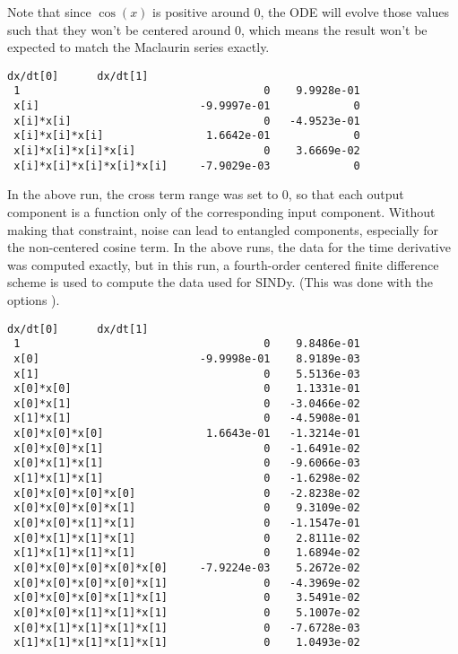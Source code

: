 \documentclass{article}
\def\lstinline#1{}%
\begin{document}
Note that since $\cos(x)$ is positive around 0, the ODE will evolve those values
such that they won't be centered around 0, which means the result won't be
expected to match the Maclaurin series exactly.
\begin{lstlisting}[language={}]
                                dx/dt[0]      dx/dt[1]
 1                                      0    9.9928e-01
 x[i]                         -9.9997e-01             0
 x[i]*x[i]                              0   -4.9523e-01
 x[i]*x[i]*x[i]                1.6642e-01             0
 x[i]*x[i]*x[i]*x[i]                    0    3.6669e-02
 x[i]*x[i]*x[i]*x[i]*x[i]     -7.9029e-03             0
\end{lstlisting}

In the above run, the cross term range was set to 0, so that each output
component is a function only of the corresponding input component. Without
making that constraint, noise can lead to entangled components, especially for
the non-centered cosine term. In the above runs, the data for the time
derivative was computed exactly, but in this run, a fourth-order centered finite
difference scheme is used to compute the data used for SINDy. (This was done
with the options \lstinline{-sindy_cross_term_range -1 -fd_der 1}).
\begin{lstlisting}[language={}]
                                dx/dt[0]      dx/dt[1]
 1                                      0    9.8486e-01
 x[0]                         -9.9998e-01    8.9189e-03
 x[1]                                   0    5.5136e-03
 x[0]*x[0]                              0    1.1331e-01
 x[0]*x[1]                              0   -3.0466e-02
 x[1]*x[1]                              0   -4.5908e-01
 x[0]*x[0]*x[0]                1.6643e-01   -1.3214e-01
 x[0]*x[0]*x[1]                         0   -1.6491e-02
 x[0]*x[1]*x[1]                         0   -9.6066e-03
 x[1]*x[1]*x[1]                         0   -1.6298e-02
 x[0]*x[0]*x[0]*x[0]                    0   -2.8238e-02
 x[0]*x[0]*x[0]*x[1]                    0    9.3109e-02
 x[0]*x[0]*x[1]*x[1]                    0   -1.1547e-01
 x[0]*x[1]*x[1]*x[1]                    0    2.8111e-02
 x[1]*x[1]*x[1]*x[1]                    0    1.6894e-02
 x[0]*x[0]*x[0]*x[0]*x[0]     -7.9224e-03    5.2672e-02
 x[0]*x[0]*x[0]*x[0]*x[1]               0   -4.3969e-02
 x[0]*x[0]*x[0]*x[1]*x[1]               0    3.5491e-02
 x[0]*x[0]*x[1]*x[1]*x[1]               0    5.1007e-02
 x[0]*x[1]*x[1]*x[1]*x[1]               0   -7.6728e-03
 x[1]*x[1]*x[1]*x[1]*x[1]               0    1.0493e-02
\end{lstlisting}
\end{document}
